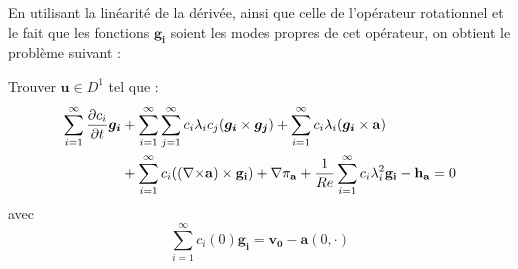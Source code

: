 En utilisant la linéarité de la dérivée, ainsi que celle de l'opérateur rotationnel et le fait que les fonctions $\bm{g_i}$ soient les modes propres de cet opérateur, on obtient le problème suivant :
\begin{pb}\label{pbc}
Trouver $\mathbf{u}\in D^1$ tel que :
\begin{align*}
\sum_{i=1}^\infty\frac{\partial c_i}{\partial t}\bm{g_i} &+ \sum_{i=1}^\infty\sum_{j=1}^\infty c_i\lambda_ic_j(\bm{g_i}\times \bm{g_j}) + \sum_{i=1}^\infty c_i\lambda_i(\bm{g_i}\times \mathbf{a})\\
& + \sum_{i=1}^\infty c_i(({\nabla\times}\mathbf{a})\times \mathbf{g_i}) + {\nabla} \pi_{\mathbf{a}} +\frac{1}{Re}\sum_{i=1}^\infty c_i\lambda_i^2\mathbf{g_i} - \mathbf{h_a} = 0\\
\end{align*}
avec \[ \sum_{i=1}^\infty c_i(0)\mathbf{g_i} = \mathbf{v_0}-\mathbf{a}(0,\cdot) \]
\end{pb}


